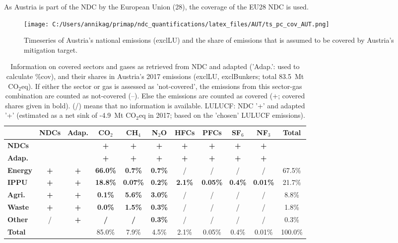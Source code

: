 \documentclass[12pt]{article}
\begin{document}
 As Austria is part of the NDC by the European Union (28), the coverage of the EU28 NDC is used.

 \begin{figure}[H]
 \centering
 \texttt{[image: C:/Users/annikag/primap/ndc\_quantifications/latex\_files/AUT/ts\_pc\_cov\_AUT.png]}
 \caption{Timeseries of Austria's national emissions (exclLU) and the share of emissions that is assumed to be covered by Austria's mitigation target.}
 \label{fig:tsPcCov}
 \end{figure}

 \begin{table}[H]\small
 \centering
 \caption{Information on covered sectors and gases as retrieved from NDC and adapted ('Adap.': used to calculate \%cov), and their shares in Austria's 2017 emissions (exclLU, exclBunkers; total 83.5~Mt CO$_2$eq).
 If either the sector or gas is assessed as 'not-covered', the emissions from this sector-gas combination are counted as not-covered (--). 
 Else the emissions are counted as covered (+; covered shares given in bold).
 (/) means that no information is available.
 LULUCF: NDC '+' and adapted '+' (estimated as a net sink of -4.9~Mt CO$_2$eq in 2017; based on the 'chosen' LULUCF emissions).}
 \label{tab:coveredSectorsGases}
 \begin{tabular}{l || c c || c c c c c c c | c}
 \bfseries  & \bfseries NDCs & \bfseries Adap. & \bfseries CO$_2$ & \bfseries CH$_4$ & \bfseries N$_2$O & \bfseries HFCs & \bfseries PFCs & \bfseries SF$_6$ & \bfseries NF$_3$ & \bfseries Total \tabularnewline \hline \hline
 \bfseries NDCs &  &  & \bfseries + & \bfseries + & \bfseries + & \bfseries + & \bfseries + & \bfseries + & \bfseries + &  \tabularnewline 
 \bfseries Adap. &  &  & \bfseries + & \bfseries + & \bfseries + & \bfseries + & \bfseries + & \bfseries + & \bfseries + &  \tabularnewline \hline \hline
 \bfseries Energy & \bfseries + & \bfseries + & \bfseries 66.0\% & \bfseries 0.7\% & \bfseries 0.7\% & / & / & / & / & 67.5\% \tabularnewline 
 \bfseries IPPU & \bfseries + & \bfseries + & \bfseries 18.8\% & \bfseries 0.07\% & \bfseries 0.2\% & \bfseries 2.1\% & \bfseries 0.05\% & \bfseries 0.4\% & \bfseries 0.01\% & 21.7\% \tabularnewline 
 \bfseries Agri. & \bfseries + & \bfseries + & \bfseries 0.1\% & \bfseries 5.6\% & \bfseries 3.0\% & / & / & / & / & 8.8\% \tabularnewline 
 \bfseries Waste & \bfseries + & \bfseries + & \bfseries 0.0\% & \bfseries 1.5\% & \bfseries 0.3\% & / & / & / & / & 1.8\% \tabularnewline 
 \bfseries Other & / & \bfseries + & \bfseries / & \bfseries / & \bfseries 0.3\% & / & / & / & / & 0.3\% \tabularnewline \hline
 \bfseries Total &  &  & 85.0\% & 7.9\% & 4.5\% & 2.1\% & 0.05\% & 0.4\% & 0.01\% & 100.0\% \tabularnewline 
 \end{tabular}
 \end{table}
\end{document}
